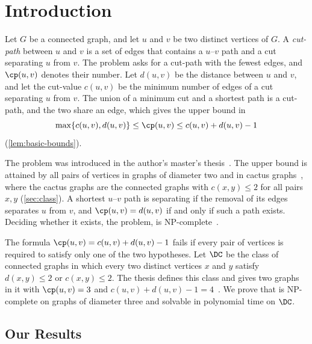 \section{Introduction}\label{sec:introduction}

Let $G$ be a connected graph, and let $u$ and $v$ be two distinct vertices of $G$.
A \emph{cut-path} between $u$ and $v$ is a set of edges that contains a $u$--$v$ path and a cut separating $u$ from $v$.
The \MinCutPath{} problem asks for a cut-path with the fewest edges, and $\cp(u, v)$ denotes their number.
Let $d(u, v)$ be the distance between $u$ and $v$, and let the cut-value $c(u, v)$ be the minimum number of edges of a cut separating $u$ from $v$.
The union of a minimum cut and a shortest path is a cut-path, and the two share an edge, which gives the upper bound in
\[
\max\{c(u, v), d(u, v)\} \leq \cp(u, v) \leq c(u, v) + d(u, v) - 1
\]
(\cref{lem:basic-bounds}).

The \MinCutPath{} problem was introduced in the author's master's thesis~\cite{Michel2025MinCutPath}.
The upper bound is attained by all pairs of vertices in graphs of diameter two and in cactus graphs~\cite[Theorems~15 and~18]{Michel2025MinCutPath}, where the cactus graphs are the connected graphs with $c(x, y) \leq 2$ for all pairs $x, y$ (\cref{sec:class}).
A shortest $u$--$v$ path is separating if the removal of its edges separates $u$ from $v$, and $\cp(u, v) = d(u, v)$ if and only if such a path exists.
Deciding whether it exists, the \SSP{} problem, is NP-complete~\cite[Theorem~3.10]{Michel2026MinCutPath}.

The formula $\cp(u, v) = c(u, v) + d(u, v) - 1$ fails if every pair of vertices is required to satisfy only one of the two hypotheses.
Let $\DC$ be the class of connected graphs in which every two distinct vertices $x$ and $y$ satisfy $d(x, y) \leq 2$ or $c(x, y) \leq 2$.
The thesis defines this class and gives two graphs in it with $\cp(u, v) = 3$ and $c(u, v) + d(u, v) - 1 = 4$~\cite[Definition~37 and Figure~3.3]{Michel2025MinCutPath}.
We prove that \MinCutPath{} is NP-complete on graphs of diameter three and solvable in polynomial time on $\DC$.

\subsection{Our Results}\label{sec:results}

